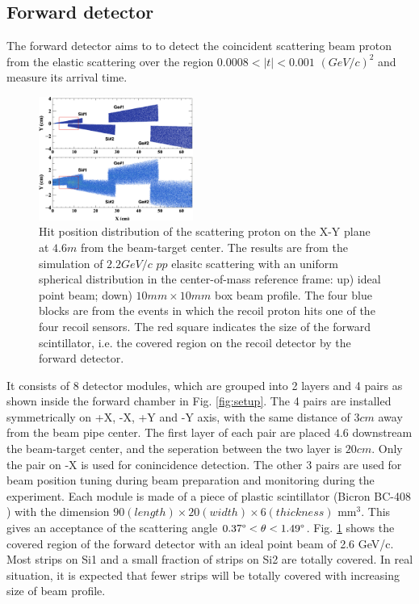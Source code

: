 \documentclass[number,5p]{elsarticle}
\begin{document}
\subsection{Forward detector}
\label{sec:fwd}

The forward detector aims to to detect the coincident scattering beam proton
from the elastic scattering over the region \(0.0008 < |t| < 0.001\)
\((GeV/c)^2\) and measure its arrival time.

\begin{figure}[htbp]
  \centering
  \includegraphics[width=0.45\textwidth]{./fwd_acceptance.png}
  \caption{
    Hit position distribution of the scattering proton on the X-Y plane at $4.6
    m$ from the beam-target center. The results are from the simulation of $2.2
    GeV/c$ $pp$ elasitc scattering with an uniform spherical distribution in the
    center-of-mass reference frame: up) ideal point beam; down) $10mm \times 10mm$ box beam profile.
    The four blue blocks are from the events in which the recoil proton hits one of
    the four recoil sensors.
    The red square indicates the size of the forward scintillator, i.e. the covered
    region on the recoil detector by the forward detector.}
  \label{fig:forward_acceptance}
\end{figure}

It consists of 8 detector modules, which are grouped into 2 layers and 4 pairs
as shown inside the forward chamber in Fig. \ref{fig:setup}.
The 4 pairs are installed symmetrically on +X, -X, +Y and -Y axis, with the same
distance of $3 cm$ away from the beam pipe center.
The first layer of each pair are placed $4.6$ downstream the
beam-target center, and the seperation between the two layer is $20 cm$.
Only the pair on -X is used for conincidence detection.
The other 3 pairs are used for beam position tuning during beam preparation and
monitoring during the experiment.
Each module is made of a piece of plastic scintillator (Bicron BC-408
\cite{bc408}) with the dimension \(90 (length) \times 20 (width) \times 6 (thickness)\) mm$^3$.
This gives an acceptance of the scattering angle \(0.37\degree < \theta < 1.49\degree\).
Fig. \ref{fig:forward_acceptance} shows the covered region of the forward detector with an ideal point beam of 2.6 GeV/c.
Most strips on Si1 and a small fraction of strips on Si2 are totally covered.
In real situation, it is expected that fewer
strips will be totally covered with increasing size of beam profile.
\end{document}
